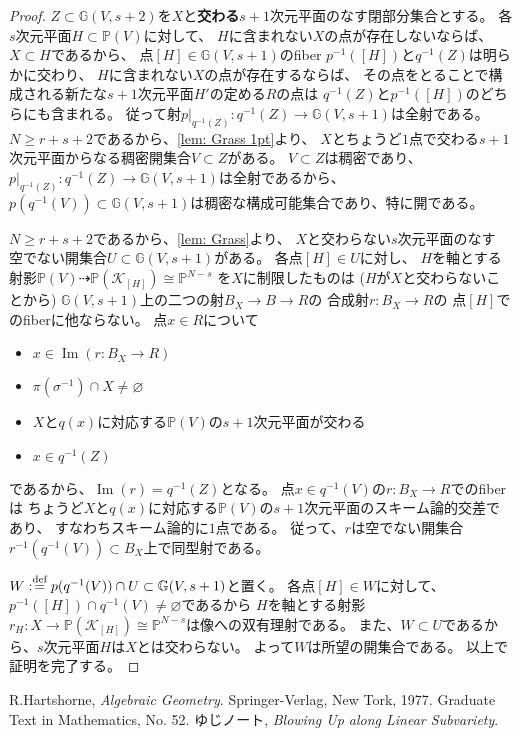\documentclass[uplatex]{jsarticle}
\theoremstyle{definition}
\DeclareMathOperator{\im}{\mathrm{Im}}
\newcommand{\G}{\mathbb{G}}
\renewcommand{\P}{\mathbb{P}}
\newcommand{\mcK}{\mathcal{K}}
\newcommand{\dto}{\dashrightarrow}
\renewcommand{\emptyset}{\varnothing}
\def\dfn{:\overset{\mbox{{\scriptsize def}}}{=}}
\begin{document}
\begin{proof}
  \(Z\subset \G(V,s+2)\)を\(X\)と\textbf{交わる}\(s+1\)次元平面のなす閉部分集合とする。
  各\(s\)次元平面\(H\subset \P(V)\)に対して、
  \(H\)に含まれない\(X\)の点が存在しないならば、\(X\subset H\)であるから、
  点\([H]\in \G(V,s+1)\)のfiber \(p^{-1}([H])\)と\(q^{-1}(Z)\)は明らかに交わり、
  \(H\)に含まれない\(X\)の点が存在するならば、
  その点をとることで構成される新たな\(s+1\)次元平面\(H'\)の定める\(R\)の点は
  \(q^{-1}(Z)\)と\(p^{-1}([H])\)のどちらにも含まれる。
  従って射\(p|_{q^{-1}(Z)}:q^{-1}(Z)\to \G(V,s+1)\)は全射である。
  \(N \geq r+s+2\)であるから、\autoref{lem: Grass 1pt}より、
  \(X\)とちょうど\(1\)点で交わる\(s+1\)次元平面からなる稠密開集合\(V\subset Z\)がある。
  \(V\subset Z\)は稠密であり、
  \(p|_{q^{-1}(Z)}:q^{-1}(Z)\to \G(V,s+1)\)は全射であるから、
  \(p(q^{-1}(V))\subset \G(V,s+1)\)は稠密な構成可能集合であり、特に開である。

  \(N \geq r+s+2\)であるから、\autoref{lem: Grass}より、
  \(X\)と交わらない\(s\)次元平面のなす
  空でない開集合\(U\subset \G(V,s+1)\)がある。
  各点\([H]\in U\)に対し、
  \(H\)を軸とする射影\(\P(V)\dto \P(\mcK_{[H]})\cong \P^{N-s}\)
  を\(X\)に制限したものは
  (\(H\)が\(X\)と交わらないことから)
  \(\G(V,s+1)\)上の二つの射\(B_X\to B\to R\)の
  合成射\(r:B_X\to R\)の
  点\([H]\)でのfiberに他ならない。
  点\(x\in R\)について
  \begin{itemize}
    \item[ \ ] \(x\in \im (r:B_X\to R)\)
    \item[\(\iff\)] \(\pi(\sigma^{-1})\cap X \neq \emptyset\)
    \item[\(\iff\)] \(X\)と\(q(x)\)に対応する\(\P(V)\)の\(s+1\)次元平面が交わる
    \item[\(\iff\)] \(x\in q^{-1}(Z)\)
  \end{itemize}
  であるから、\(\im (r) = q^{-1}(Z)\)となる。
  点\(x\in q^{-1}(V)\)の\(r:B_X\to R\)でのfiberは
  ちょうど\(X\)と\(q(x)\)に対応する\(\P(V)\)の\(s+1\)次元平面のスキーム論的交差であり、
  すなわちスキーム論的に\(1\)点である。
  従って、\(r\)は空でない開集合\(r^{-1}(q^{-1}(V))\subset B_X\)上で同型射である。

  \(W\dfn p(q^{-1}(V))\cap U\subset \G(V,s+1)\)と置く。
  各点\([H]\in W\)に対して、
  \(p^{-1}([H])\cap q^{-1}(V)\neq \emptyset\)であるから
  \(H\)を軸とする射影\(r_H:X\to \P(\mcK_{[H]})\cong \P^{N-s}\)は像への双有理射である。
  また、\(W\subset U\)であるから、\(s\)次元平面\(H\)は\(X\)とは交わらない。
  よって\(W\)は所望の開集合である。
  以上で証明を完了する。
\end{proof}








\begin{thebibliography}{9}
  R.Hartshorne,
  \textit{Algebraic Geometry}.
  Springer-Verlag, New Tork, 1977. Graduate Text in Mathematics, No. 52.
  ゆじノート,
  \textit{Blowing Up along Linear Subvariety}.
\end{thebibliography}
\end{document}
